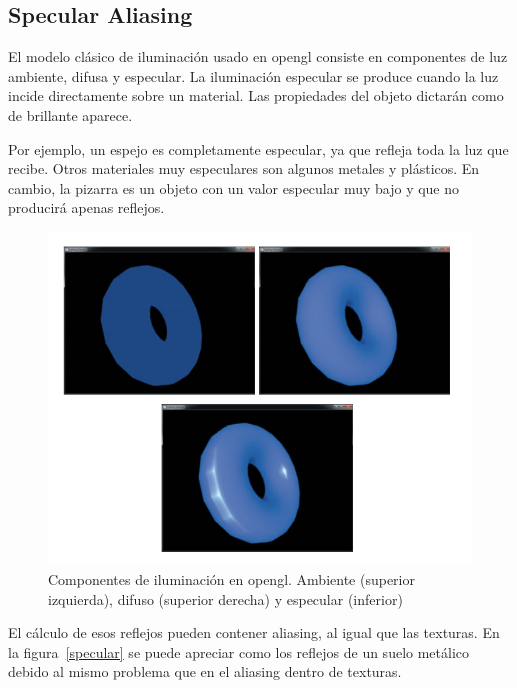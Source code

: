 \documentclass[withindex, glossary]{cam-thesis}
\begin{document}
\subsection{Specular Aliasing}

El modelo clásico de iluminación usado en \Gls{opengl} consiste en componentes de luz ambiente, difusa y especular\cite{Shreiner:2013:OPG:2544032}. La iluminación especular se produce cuando la luz incide directamente sobre un material. Las propiedades del objeto dictarán como de brillante aparece.

Por ejemplo, un espejo es completamente especular, ya que refleja toda la luz que recibe. Otros materiales muy especulares son algunos metales y plásticos. En cambio, la pizarra es un objeto con un valor especular muy bajo y que no producirá apenas reflejos.

\begin{figure}[!htbp]
    \centering
    \includegraphics[width=.8\linewidth]{figures/iluminacion.png}
    \caption{Componentes de iluminación en \Gls{opengl}\@. Ambiente (superior izquierda), difuso (superior derecha) y especular (inferior)\cite{Shreiner:2013:OPG:2544032}\label{gls}}
\end{figure}

El cálculo de esos reflejos pueden contener aliasing, al igual que las texturas. En la figura~\ref{specular} se puede apreciar como los reflejos de un suelo metálico debido al mismo problema que en el aliasing dentro de texturas.
\end{document}
